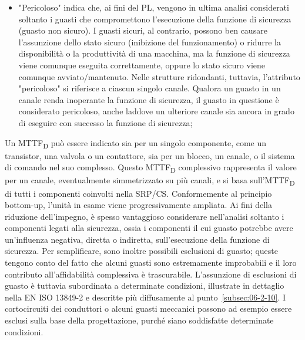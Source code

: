 \begin{itemize}
    \item "Pericoloso" indica che, ai fini del PL, vengono in ultima analisi considerati soltanto i guasti che compromettono l'esecuzione della funzione di sicurezza (guasto non sicuro). I guasti sicuri, al contrario, possono ben causare l'assunzione dello stato sicuro (inibizione del funzionamento) o ridurre la disponibilità o la produttività di una macchina, ma la funzione di sicurezza viene comunque eseguita correttamente, oppure lo stato sicuro viene comunque avviato/mantenuto. Nelle strutture ridondanti, tuttavia, l'attributo "pericoloso" si riferisce a ciascun singolo canale. Qualora un guasto in un canale renda inoperante la funzione di sicurezza, il guasto in questione è considerato pericoloso, anche laddove un ulteriore canale sia ancora in grado di eseguire con successo la funzione di sicurezza;
\end{itemize}

Un MTTF\textsubscript{D} può essere indicato sia per un singolo componente, come un transistor, una valvola o un contattore, sia per un blocco, un canale, o il sistema di comando nel suo complesso. Questo MTTF\textsubscript{D} complessivo rappresenta il valore per un canale, eventualmente simmetrizzato su più canali, e si basa sull'MTTF\textsubscript{D} di tutti i componenti coinvolti nella SRP/CS. Conformemente al principio bottom-up, l'unità in esame viene progressivamente ampliata. Ai fini della riduzione dell'impegno, è spesso vantaggioso considerare nell'analisi soltanto i componenti legati alla sicurezza, ossia i componenti il cui guasto potrebbe avere un'influenza negativa, diretta o indiretta, sull'esecuzione della funzione di sicurezza. Per semplificare, sono inoltre possibili esclusioni di guasto; queste tengono conto del fatto che alcuni guasti sono estremamente improbabili e il loro contributo all'affidabilità complessiva è trascurabile. L'assunzione di esclusioni di guasto è tuttavia subordinata a determinate condizioni, illustrate in dettaglio nella EN ISO 13849-2 e descritte più diffusamente al punto~\ref{subsec:06-2-10}. I cortocircuiti dei conduttori o alcuni guasti meccanici possono ad esempio essere esclusi sulla base della progettazione, purché siano soddisfatte determinate condizioni.

